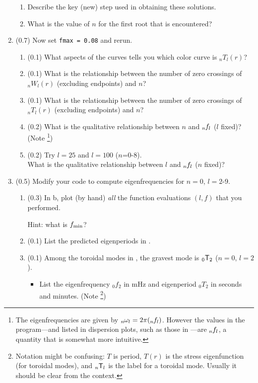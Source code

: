 \documentclass[11pt,titlepage,fleqn]{article}
\newcommand{\tnl}[2]{\mbox{$_{#1}\ssT_{#2}$}}
\newcommand{\Tnl}{\mbox{${}_nT_l$}}   %
\newcommand{\Wnl}{\mbox{${}_nW_l$}}   %
\newcommand{\omnl}{\mbox{${}_{n\hspace{-0.2 mm}}\omega_l$}}  %
\newcommand{\fnl}{\mbox{${}_{n\hspace{-0.2 mm}}f_l$}}        %
\begin{document}
\begin{enumerate}
\begin{enumerate}
\item Describe the key (new) step used in obtaining these solutions.

\item What is the value of $n$ for the first root that is encountered?

\end{enumerate}


\item (0.7) Now set \verb+fmax = 0.08+ and rerun.
%
\begin{enumerate}
\item (0.1) What aspects of the curves tells you which color curve is $\Tnl(r)$?
\item (0.1) What is the relationship between the number of zero crossings of $\Wnl(r)$ (excluding endpoints) and $n$?
\item (0.1) What is the relationship between the number of zero crossings of $\Tnl(r)$ (excluding endpoints) and $n$?
\item (0.2) What is the qualitative relationship between $n$ and $\fnl$ ($l$ fixed)? (Note \footnote{The eigenfrequencies are given by $\omnl = 2\pi(\fnl)$. However the values in the program---and listed in dispersion plots, such as those in \citet{SteinWysession}---are $\fnl$, a quantity that is somewhat more intuitive.})
\item (0.2) Try $l=25$ and $l=100$ ($n$=0-8). \\
What is the qualitative relationship between $l$ and $\fnl$ ($n$ fixed)?
\end{enumerate}


\item (0.5) Modify your code to compute eigenfrequencies for $n=0$, $l=2$-9.
%
\begin{enumerate}
\item (0.3) In b, plot (by hand) {\em all} the function evaluations $(l, f)$ that you performed.

Hint: what is $f_{\rm min}$?

\item (0.1) List the predicted eigenperiods in .

\item (0.1) Among the toroidal modes in , the gravest mode is \tnl{0}{2} ($n=0$, $l=2$).
%
\begin{itemize}
\item List the eigenfrequency $_0f_2$ in mHz and eigenperiod $_0T_2$ in seconds and minutes. (Note \footnote{Notation might be confusing: $T$ is period, $T(r)$ is the stress eigenfunction (for toroidal modes), and \tnl{n}{l} is the label for a toroidal mode. Usually it should be clear from the context.})


\end{itemize}
\end{enumerate}
\end{enumerate}
\end{document}
